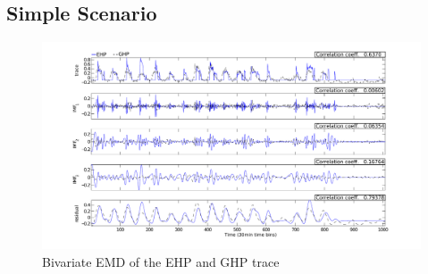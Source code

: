 \subsection{Simple Scenario}

\begin{figure}[tb]
\hspace{-2cm}
\includegraphics[width=1.2\textwidth]{img/emd_25_41-eps-converted-to}
\vspace{-1cm}
\caption{Bivariate EMD of the EHP and GHP trace}
\label{fig:emd2}
\end{figure}






